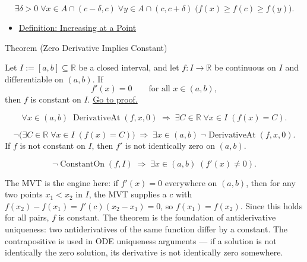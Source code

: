 \begin{remark*}
\[
\exists \delta > 0\;\forall x \in A \cap (c-\delta,c)\;\forall y \in A \cap (c,c+\delta)
\;\bigl(f(x) \geq f(c) \geq f(y)\bigr).
\]
\end{remark*}

\begin{remark*}[Dependencies]
\begin{itemize}
  \item \hyperref[def:increasing-at-a-point]{Definition: Increasing at a Point}
\end{itemize}
\end{remark*}


\begin{theorembox}{Theorem (Zero Derivative Implies Constant)}
\begin{theorem}
\label{thm:zero-derivative-implies-constant}
Let $I := [a,b] \subseteq \mathbb{R}$ be a closed interval, and let $f : I \to \mathbb{R}$ be continuous on $I$ and differentiable on $(a,b)$. If
\[
f'(x) = 0 \qquad \text{for all } x \in (a,b),
\]
then $f$ is constant on $I$.
\hyperref[prf:zero-derivative-implies-constant]{Go to proof.}
\end{theorem}
\end{theorembox}

\begin{remark*}
\[
\forall x \in (a,b)\;\operatorname{DerivativeAt}(f,x,0)
\;\Rightarrow\;
\exists C \in \mathbb{R}\;\forall x \in I\;(f(x) = C).
\]
\end{remark*}

\begin{remark*}
\[
\lnot\bigl(\exists C \in \mathbb{R}\;\forall x \in I\;(f(x)=C)\bigr)
\;\Rightarrow\;
\exists x \in (a,b)\;\lnot\operatorname{DerivativeAt}(f,x,0).
\]
If $f$ is not constant on $I$, then $f'$ is not identically zero on $(a,b)$.
\end{remark*}

\begin{remark*}
\[
\lnot\operatorname{ConstantOn}(f,I) \;\Rightarrow\; \exists x \in (a,b)\;(f'(x) \neq 0).
\]
\end{remark*}

\begin{remark*}[Interpretation]
The MVT is the engine here: if $f'(x) = 0$ everywhere on $(a,b)$, then for any two points $x_1 < x_2$ in $I$, the MVT supplies a $c$ with $f(x_2)-f(x_1) = f'(c)(x_2-x_1) = 0$, so $f(x_1) = f(x_2)$. Since this holds for all pairs, $f$ is constant. The theorem is the foundation of antiderivative uniqueness: two antiderivatives of the same function differ by a constant. The contrapositive is used in ODE uniqueness arguments --- if a solution is not identically the zero solution, its derivative is not identically zero somewhere.
\end{remark*}

